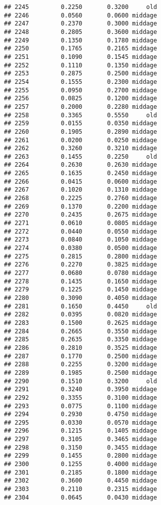 \documentclass[
]{article}
\begin{document}
\begin{verbatim}
## 2245         0.2250       0.3200     old
## 2246         0.0560       0.0600 middage
## 2247         0.2370       0.3000 middage
## 2248         0.2805       0.3600 middage
## 2249         0.1350       0.1780 middage
## 2250         0.1765       0.2165 middage
## 2251         0.1090       0.1545 middage
## 2252         0.1110       0.1350 middage
## 2253         0.2875       0.2500 middage
## 2254         0.1555       0.2300 middage
## 2255         0.0950       0.2700 middage
## 2256         0.0825       0.1200 middage
## 2257         0.2000       0.2280 middage
## 2258         0.3365       0.5550     old
## 2259         0.0155       0.0350 middage
## 2260         0.1905       0.2890 middage
## 2261         0.0200       0.0250 middage
## 2262         0.3260       0.3210 middage
## 2263         0.1455       0.2250     old
## 2264         0.2630       0.2630 middage
## 2265         0.1635       0.2450 middage
## 2266         0.0415       0.0600 middage
## 2267         0.1020       0.1310 middage
## 2268         0.2225       0.2760 middage
## 2269         0.1370       0.2200 middage
## 2270         0.2435       0.2675 middage
## 2271         0.0610       0.0805 middage
## 2272         0.0440       0.0550 middage
## 2273         0.0840       0.1050 middage
## 2274         0.0380       0.0500 middage
## 2275         0.2815       0.2800 middage
## 2276         0.2270       0.3825 middage
## 2277         0.0680       0.0780 middage
## 2278         0.1435       0.1650 middage
## 2279         0.1225       0.1450 middage
## 2280         0.3090       0.4050 middage
## 2281         0.1650       0.4450     old
## 2282         0.0395       0.0820 middage
## 2283         0.1500       0.2625 middage
## 2284         0.2665       0.3550 middage
## 2285         0.2635       0.3350 middage
## 2286         0.2810       0.3525 middage
## 2287         0.1770       0.2500 middage
## 2288         0.2255       0.3200 middage
## 2289         0.1985       0.2500 middage
## 2290         0.1510       0.3200     old
## 2291         0.3240       0.3950 middage
## 2292         0.3355       0.3100 middage
## 2293         0.0775       0.1100 middage
## 2294         0.2930       0.4750 middage
## 2295         0.0330       0.0570 middage
## 2296         0.1215       0.1405 middage
## 2297         0.3105       0.3465 middage
## 2298         0.3150       0.3455 middage
## 2299         0.1455       0.2800 middage
## 2300         0.1255       0.4000 middage
## 2301         0.2185       0.1800 middage
## 2302         0.3600       0.4450 middage
## 2303         0.2110       0.2315 middage
## 2304         0.0645       0.0430 middage

\end{verbatim}
\end{document}
